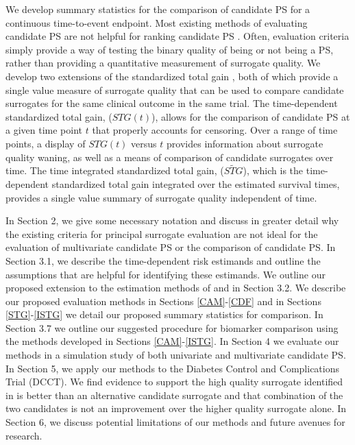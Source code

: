 \documentclass[times, doublespace]{simauth}
\begin{document}
We develop summary statistics for the comparison of candidate PS for a continuous time-to-event endpoint. Most existing methods of evaluating candidate PS are not helpful for ranking candidate PS . Often, evaluation criteria simply provide a way of testing the binary quality of being or not being a PS, rather than providing a quantitative measurement of surrogate quality. We develop two extensions of the standardized total gain \citet{Huang11}, both of which provide a single value measure of surrogate quality that can be used to compare candidate surrogates for the same clinical outcome in the same trial. The time-dependent standardized total gain, ($STG(t)$), allows for the comparison of candidate PS at a given time point $t$ that properly accounts for censoring. Over a range of time points, a display of $STG(t)$ versus $t$ provides information about surrogate quality waning, as well as a means of comparison of candidate surrogates over time. The time integrated  standardized total gain, ($\widetilde{STG}$), which is the time-dependent standardized total gain integrated over the estimated survival times, provides a single value summary of surrogate quality independent of time. 

In Section 2, we give some necessary notation and discuss in greater detail why the existing criteria for principal surrogate evaluation are not ideal for the evaluation of multivariate candidate PS or the comparison of candidate PS.  In Section 3.1, we describe the time-dependent risk estimands and outline the assumptions that are helpful for identifying these estimands.  We outline our proposed extension to the estimation methods of \citet{Huang11} and \citet{Gabriel13} in Section 3.2.  We describe our proposed evaluation methods in Sections \ref{CAM}-\ref{CDF} and in Sections \ref{STG}-\ref{ISTG} we detail our proposed summary statistics for comparison. In Section 3.7 we outline our suggested procedure for biomarker comparison using the methods developed in Sections \ref{CAM}-\ref{ISTG}. In Section 4 we evaluate our methods in a simulation study of both univariate and multivariate candidate PS. In Section 5, we apply our methods to the Diabetes Control and Complications Trial (DCCT). We find evidence to support the high quality surrogate identified in \citet{Gabriel13} is better than an alternative candidate surrogate and that combination of the two candidates is not an improvement over the higher quality surrogate alone. In Section 6, we discuss potential limitations of our methods and future avenues for research. 
\end{document}
